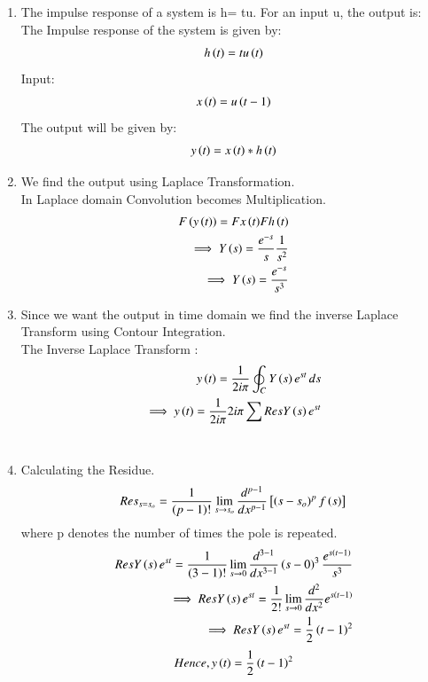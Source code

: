 \begin{enumerate}[label=\thesubsection.\arabic*.,ref=\thesubsection.\theenumi]

\item The impulse response of a system is h= tu. For an input u, the output is:\\

\solution The Impulse response of the system is given by:
\begin{align}h\left(t\right)= tu\left(t\right)
\end{align}
Input:
\begin{align}x\left(t\right)=u\left(t-1\right)
\end{align}
The output will be given by:
\begin{align}y\left(t\right)= x\left(t\right)\ast h\left(t\right)
\end{align}

%
\item We find the output using Laplace Transformation.
\\
In Laplace domain Convolution becomes Multiplication.
\begin{align}
F\left(y\left(t\right)\right)=F{x\left(t\right)} F{h\left(t\right)}
\\
\implies Y\left(s\right)=\frac{e^{-s}}{s} \frac{1}{s^{2}}
\\
\implies Y\left(s\right)=\frac{e^{-s}}{s^{3}}
\end{align}
\item Since we want the output in time domain we find the inverse Laplace Transform using Contour Integration.\\
The Inverse Laplace Transform :
\begin{align}
y\left(t\right) = \frac{1}{2i\pi}\oint_C Y\left(s\right)e^{st} \,ds\\
\implies y\left(t\right)=\frac{1}{2i\pi}2i\pi\sum Res Y\left(s\right)e^{st}
\end{align}
\\
\item Calculating the Residue.
\\
\begin{align}
Res_{s=s_o}=\frac{1}{\left(p-1\right)!} \lim_{s\to s_{o}}  \frac{d^{p-1} }{d x^{p-1}}{}\left[\left(s-s_{o}\right)^p f\left(s\right)\right]
\end{align}
where p denotes the number of times the pole is repeated.\\
\begin{align}
ResY\left(s\right)e^{st}=\frac{1}{(3-1)!}\lim_{s\to 0}  \frac{d^{3-1}}{d x^{3-1}} \left(s-0\right)^{3}
\frac{e^{s\left(t-1\right)}}{s^{3}}\\
\implies ResY\left(s\right)e^{st} = \frac{1}{2!}\lim_{s\to 0}  \frac{d^{2} }{d x^{2}} 
{e^{s\left(t-1\right)}}\\
\implies ResY\left(s\right)e^{st} = \frac{1}{2} \left(t-1\right)^{2}
\end{align}
\begin{align}
Hence, y\left(t\right)=\frac{1}{2}\left(t-1\right)^{2}
\end{align}


\end{enumerate}
